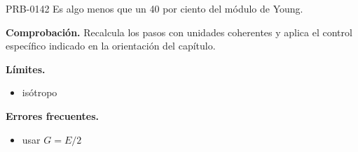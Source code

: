 \begin{studiumworked}{PRB-0142}
Es algo menos que un 40 por ciento del módulo de Young.

\par\textbf{Comprobación.} Recalcula los pasos con unidades coherentes y aplica el control específico indicado en la orientación del capítulo.

\textbf{Límites.}\begin{itemize}\item isótropo\end{itemize}

\textbf{Errores frecuentes.}\begin{itemize}\item usar $G = E/2$\end{itemize}

\end{studiumworked}

\Needspace{.3\textheight}

